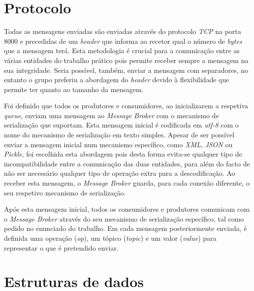 \documentclass[10pt,portuguese]{article}
\begin{document}
\section{Protocolo}

\par Todas as mensagens enviadas são enviadas através do protocolo \textit{TCP} na porta 8000 e precedidas de um \textit{header} que informa ao recetor qual o número de \textit{bytes} que a mensagem terá. Esta metodologia é crucial para a comunicação entre as várias entidades do trabalho prático pois permite receber sempre a mensagem na sua integridade. Seria possível, também, enviar a mensagem com separadores, no entanto o grupo preferiu a abordagem do \textit{header} devido à flexibilidade que permite ter quanto ao tamanho da mensagem.

\par Foi definido que todos os produtores e consumidores, ao inicializarem a respetiva \textit{queue}, enviam uma mensagem ao \textit{Message Broker} com o mecanismo de serialização que suportam. Esta mensagem inicial é codificada em \textit{utf-8} com o nome do mecanismo de serialização em texto simples. Apesar de ser possível enviar a mensagem inicial num mecanismo específico, como \textit{XML}, \textit{JSON} ou \textit{Pickle}, foi escolhida esta abordagem pois desta forma evita-se qualquer tipo de incompatibilidade entre a comunicação das duas entidades, para além do facto de não ser necessário qualquer tipo de operação extra para a descodificação. Ao receber esta mensagem, o \textit{Message Broker} guarda, para cada conexão diferente, o seu respetivo mecanismo de serialização.

\par Após esta mensagem inicial, todos os consumidores e produtores comunicam com o \textit{Message Broker} através do seu mecanismo de serialização específico, tal como pedido no enunciado do trabalho. Em cada mensagem posteriormente enviada, é definida uma operação (\textit{op}), um tópico (\textit{topic}) e um valor (\textit{value}) para representar o que é pretendido enviar.


\section{Estruturas de dados}
\end{document}
